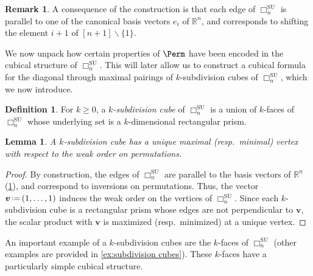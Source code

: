 \documentclass{amsart}
\newcommand{\darkblue}{\color{darkblue}} %
\newtheorem{lemma}[theorem]{Lemma}
\theoremstyle{definition}
\newtheorem{definition}[theorem]{Definition}
\newtheorem{remark}[theorem]{Remark}
\newcommand{\R}{\mathbb{R}} %
\renewcommand{\b}[1]{{\boldsymbol{#1}}} %
\newcommand{\ssm}{\smallsetminus} %
\newcommand{\eqdef}{\mbox{\,\raisebox{0.2ex}{\scriptsize\ensuremath{\mathrm:}}\ensuremath{=}\,}} %
\newcommand{\resp}{resp.~} %
\newcommand{\defn}[1]{\textsl{\darkblue #1}} %
\renewcommand{\b}[1]{\boldsymbol{#1}} %
\newcommand{\SU}{\mathrm{SU}}
\newcommand{\divcube}[1]{\Box_{#1}}
\begin{document}
\begin{remark}
	\label{rem:coordinates}
	A consequence of the construction is that each edge of $\divcube{n}^\SU$ is parallel to one of the canonical basis vectors $e_i$ of $\R^n$, and corresponds to shifting the element $i+1$ of $[n+1]\ssm \{1\}$.
\end{remark}

We now unpack how certain properties of $\Perm$ have been encoded in the cubical structure of $\divcube{n}^\SU$.
This will later allow us to construct a cubical formula for the diagonal through maximal pairings of $k$-subdivision cubes of $\divcube{n}^\SU$, which we now introduce.

\begin{definition} 
\label{def:Subdivisions}
For $k\geq 0$, a \defn{$k$-subdivision cube} of $\divcube{n}^\SU$ is a union of $k$-faces of $\divcube{n}^\SU$ whose underlying set is a $k$-dimensional rectangular prism.
\end{definition}

\begin{lemma}
\label{lem:k-subdiv cubes have max/min k faces}
A $k$-subdivision cube has a unique maximal (\resp minimal) vertex with respect to the weak order on permutations.
\end{lemma}

\begin{proof}
	By construction, the edges of $\divcube{n}^\SU$ are parallel to the basis vectors of $\R^n$ (\cref{rem:coordinates}), and correspond to inversions on permutations. 
	Thus, the vector $\b{v}\eqdef(1,\ldots,1)$ induces the weak order on the vertices of $\divcube{n}^\SU$.  
	Since each $k$-subdivision cube is a rectangular prism whose edges are not perpendicular to $\b{v}$, the scalar product with $\b{v}$ is maximized (\resp minimized) at a unique vertex. 
\end{proof}

An important example of a $k$-subdivision cubes are the $k$-faces of $\divcube{n}^\SU$ (other examples are provided in \cref{ex:subdivision cubes}).
These $k$-faces have a particularly simple cubical structure.
\end{document}
